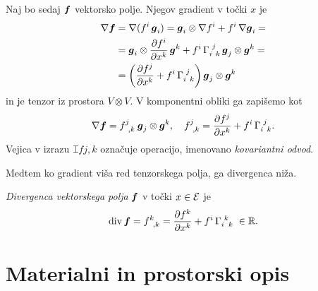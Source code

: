 Naj bo sedaj $\boldsymbol f$ vektorsko polje. Njegov gradient v točki $x$ je
\begin{align*}
	\nabla \vek{f}&=\nabla(f^i\,\vek{g}_i)=\vek{g}_i\otimes\nabla f^i + f^i\,\nabla\vek{g}_i=\\
	&=\vek{g}_i\otimes\frac{\partial f^i}{\partial x^k}\,\vek{g}^k+f^i\,\cs{i}{j}{k}\,\vek{g}_j\otimes\vek{g}^k=\\
	&=\left(\frac{\partial f^j}{\partial x^k}+f^i\,\cs{i}{j}{k}\right)\vek{g}_j\otimes\vek{g}^k
\end{align*}
in je tenzor iz prostora $V\otimes V$. V komponentni obliki ga zapišemo kot
\begin{equation*}
	\nabla\vek{f}= \topbot{f}{j}{,k}\:\vek{g}_j\otimes\vek{g}^k,\quad
	\topbot{f}{j}{,k}=\frac{\partial f^j}{\partial x^k}+f^i\,\cs{i}{j}{k}.
\end{equation*}
Vejica v izrazu $\topbot{f}{j}{,k}$ označuje operacijo, imenovano \emph{kovariantni odvod}.

Medtem ko gradient viša red tenzorskega polja, ga divergenca niža.
\begin{definicija}
	\emph{Divergenca vektorskega polja} $\boldsymbol f$ v točki $x\in\mathcal E$ je
	\begin{equation*}
		\div \vek{f}=\topbot{f}{k}{,k}=\frac{\partial f^k}{\partial x^k}+f^i\,\cs{i}{k}{k}\;\in\R.
	\end{equation*}
\end{definicija}


\section{Materialni in prostorski opis}


